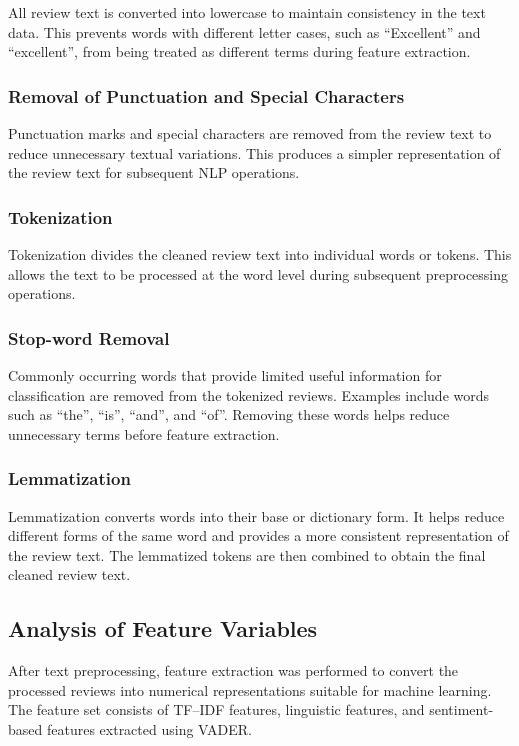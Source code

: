 \documentclass[12pt,a4paper]{report}
\begin{document}
All review text is converted into lowercase to maintain consistency in the text data. This prevents words with different letter cases, such as ``Excellent'' and ``excellent'', from being treated as different terms during feature extraction.

\subsubsection*{Removal of Punctuation and Special Characters}

Punctuation marks and special characters are removed from the review text to reduce unnecessary textual variations. This produces a simpler representation of the review text for subsequent NLP operations.

\subsubsection*{Tokenization}

Tokenization divides the cleaned review text into individual words or tokens. This allows the text to be processed at the word level during subsequent preprocessing operations.

\subsubsection*{Stop-word Removal}

Commonly occurring words that provide limited useful information for classification are removed from the tokenized reviews. Examples include words such as ``the'', ``is'', ``and'', and ``of''. Removing these words helps reduce unnecessary terms before feature extraction.

\subsubsection*{Lemmatization}

Lemmatization converts words into their base or dictionary form. It helps reduce different forms of the same word and provides a more consistent representation of the review text. The lemmatized tokens are then combined to obtain the final cleaned review text.


\subsection{Analysis of Feature Variables}

After text preprocessing, feature extraction was performed to convert the processed reviews into numerical representations suitable for machine learning. The feature set consists of TF--IDF features, linguistic features, and sentiment-based features extracted using VADER.
\end{document}
